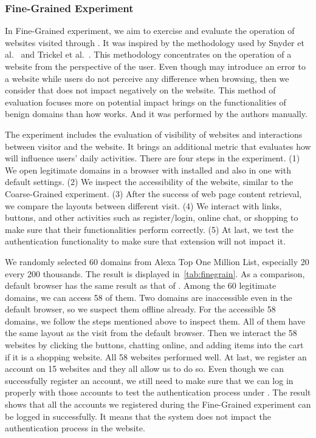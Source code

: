 \subsubsection{Fine-Grained Experiment}

\finegrain


In Fine-Grained experiment, we aim to exercise and evaluate the operation of websites visited through \spartacus.
It was inspired by the methodology used by Snyder et al.~\cite{snyder2017most} and Trickel et al.~\cite{trickel2019everyone}.
This methodology concentrates on the operation of a website from the perspective of the user.
Even though \spartacus may introduce an error to a website while users do not perceive any difference when browsing, then we consider that \spartacus does not impact negatively on the website.
This method of evaluation focuses more on potential impact \spartacus brings on the functionalities of benign domains than how \spartacus works.
And it was performed by the authors manually.

The experiment includes the evaluation of visibility of websites and interactions between visitor and the website.
It brings an additional metric that evaluates how \spartacus will influence users' daily activities.
There are four steps in the experiment.
(1) We open legitimate domains in a browser with \spartacus installed and also in one with default settings.
(2) We inspect the accessibility of the website, similar to the Coarse-Grained experiment.
(3) After the success of web page content retrieval, we compare the layouts between different visit.
(4) We interact with links, buttons, and other activities such as register/login, online chat, or shopping to make sure that their functionalities perform correctly.
(5) At last, we test the authentication functionality to make sure that \spartacus extension will not impact it.

We randomly selected 60 domains from Alexa Top One Million List, especially 20 every 200 thousands.
The result is displayed in~\autoref{tab:finegrain}.
As a comparison, default browser has the same result as that of \spartacus.
Among the 60 legitimate domains, we can access 58 of them.
Two domains are inaccessible even in the default browser, so we suspect them offline already.
For the accessible 58 domains,
we follow the steps mentioned above to inspect them.
All of them have the same layout as the visit from the default browser.
Then we interact the 58 websites by clicking the buttons, chatting online, and adding items into the cart if it is a shopping website.
All 58 websites performed well.
At last, we register an account on 15 websites and they all allow us to do so.
Even though we can successfully register an account, we still need to make sure that we can log in properly with those accounts to test the authentication process under \spartacus.
The result shows that all the accounts we registered during the Fine-Grained experiment can be logged in successfully.
It means that the \spartacus system does not impact the authentication process in the website.

